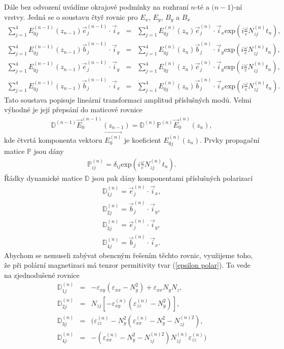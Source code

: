 Dále bez odvození uvádíme okrajové podmínky na rozhraní $n$-té a $(n-1$)-ní vrstvy. Jedná se o soustavu čtyř rovnic pro $E_x$, $E_y$, $B_y$ a $B_x$ %
\begin{eqnarray}
\sum^4_{j=1}E_{0j}^{(n-1)}(z_{n-1})\vec{e}_j^{(n-1)}\cdot\vec{i}_x &=& \sum^4_{j=1}E_{0j}^{(n)}(z_n)\vec{e}_j^{(n)}\cdot\vec{i}_x \mbox{exp}\left(i\frac{\omega}{c}N_{zj}^{(n)}t_n\right), \\
\sum^4_{j=1}E_{0j}^{(n-1)}(z_{n-1})\vec{b}_j^{(n-1)}\cdot\vec{i}_y &=& \sum^4_{j=1}E_{0j}^{(n)}(z_n)\vec{b}_j^{(n)}\cdot\vec{i}_y \mbox{exp}\left(i\frac{\omega}{c}N_{zj}^{(n)}t_n\right), \\
\sum^4_{j=1}E_{0j}^{(n-1)}(z_{n-1})\vec{e}_j^{(n-1)}\cdot\vec{i}_y &=& \sum^4_{j=1}E_{0j}^{(n)}(z_n)\vec{e}_j^{(n)}\cdot\vec{i}_y \mbox{exp}\left(i\frac{\omega}{c}N_{zj}^{(n)}t_n\right), \\
\sum^4_{j=1}E_{0j}^{(n-1)}(z_{n-1})\vec{b}_j^{(n-1)}\cdot\vec{i}_x &=& \sum^4_{j=1}E_{0j}^{(n)}(z_n)\vec{b}_j^{(n)}\cdot\vec{i}_x \mbox{exp}\left(i\frac{\omega}{c}N_{zj}^{(n)}t_n\right).
\end{eqnarray}
Tato soustava popisuje lineární transformaci amplitud příslušných modů. Velmi výhodné je její přepsání do maticové rovnice
\begin{eqnarray}
\mathbb{D}^{(n-1)}\vec{E}_0^{(n-1)}(z_{n-1})=\mathbb{D}^{(n)}\mathbb{P}^{(n)}\vec{E}^{(n)}_0(z_n),
\end{eqnarray}
kde čtvrtá komponenta vektoru $\vec{E_0^{(n)}}$ je koeficient $E^{(n)}_{0j}(z_n)$. Prvky propagační matice $\mathbb{P}$ jsou dány
\begin{eqnarray}
\mathbb{P}_{ij}^{(n)}=\delta_{ij} \mbox{exp}\left(i\frac{\omega}{c}N_{zj}^{(n)}t_n\right).
\end{eqnarray}
Řádky dynamické matice $\mathbb{D}$ jsou pak dány komponentami příslušných polarizací
\begin{eqnarray}
\mathbb{D}_{1j}^{(n)}=\vec{e}_j^{(n)}\cdot\vec{i}_x, \\
\mathbb{D}_{2j}^{(n)}=\vec{b}_j^{(n)}\cdot\vec{i}_y, \\
\mathbb{D}_{3j}^{(n)}=\vec{e}_j^{(n)}\cdot\vec{i}_y, \\
\mathbb{D}_{4j}^{(n)}=\vec{b}_j^{(n)}\cdot\vec{i}_x.
\end{eqnarray}
Abychom se nemuseli zabývat obencným řešením těchto rovnic, využijeme toho, že při polární magnetizaci má tenzor permitivity tvar (\ref{epsilon polar}). To vede na zjednodušené rovnice
\begin{eqnarray}
\mathbb{D}_{1j}^{(n)}&=& -\varepsilon_{xy}(\varepsilon_{xx}-N_y^2)+\varepsilon_{xx}N_yN_z, \\
\mathbb{D}_{2j}^{(n)}&=&N_{zj}[-\varepsilon_{xy}^{(n)}(\varepsilon_{zz}^{(n)}-N_y^2)], \\
\mathbb{D}_{3j}^{(n)}&=&(\varepsilon_{zz}^{(n)}-N^2_y(\varepsilon_{xx}^{(n)}-N_y^2-N_{zj}^{(n)2}), \\
\mathbb{D}_{4j}^{(n)}&=&-(\varepsilon_{xx}^{(n)}-N_y^2-N_{zj}^{(n)2})N_{zj}^{(n)}\varepsilon_{zz}^{(n)})
\end{eqnarray}
